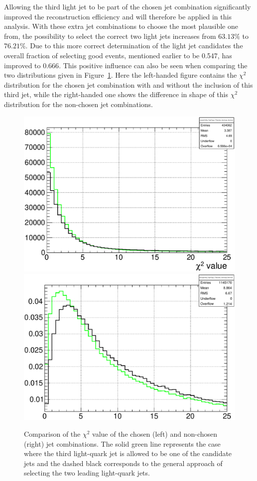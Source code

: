 Allowing the third light jet to be part of the chosen jet combination significantly improved the reconstruction efficiency and will therefore be applied in this analysis.
With these extra jet combinations to choose the most plausible one from, the possibility to select the correct two light jets increases from $63.13 \%$ to $76.21 \%$.
Due to this more correct determination of the light jet candidates the overall fraction of selecting good events, mentioned earlier to be 0.547, has improved to $0.666$.
This positive influence can also be seen when comparing the two distributions given in Figure~\ref{fig::ChiSq_4vs5Jets}. 
Here the left-handed figure contains the $\chi^{2}$ distribution for the chosen jet combination with and without the inclusion of this third jet, while the right-handed one shows the difference in shape of this $\chi^{2}$ distribution for the non-chosen jet combinations.
\begin{figure}[h!t]
 \centering
 \includegraphics[width = 0.45 \textwidth]{Chapters/Chapter4_EvtSel/Figures/LowestChiSqComparison.pdf}
 \includegraphics[width = 0.45 \textwidth]{Chapters/Chapter4_EvtSel/Figures/WrongChiSqComparison.pdf}    %
 \caption{Comparison of the $\chi^{2}$ value of the chosen (left) and non-chosen (right) jet combinations. The solid green line represents the case where the third light-quark jet is allowed to be one of the candidate jets and the dashed black corresponds to the general approach of selecting the two leading light-quark jets.} \label{fig::ChiSq_4vs5Jets}
\end{figure}

